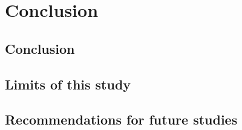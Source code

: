 \chapter{Conclusion}
	 \section{Conclusion}
	 \section{Limits of this study}
	 \section{Recommendations for future studies}
